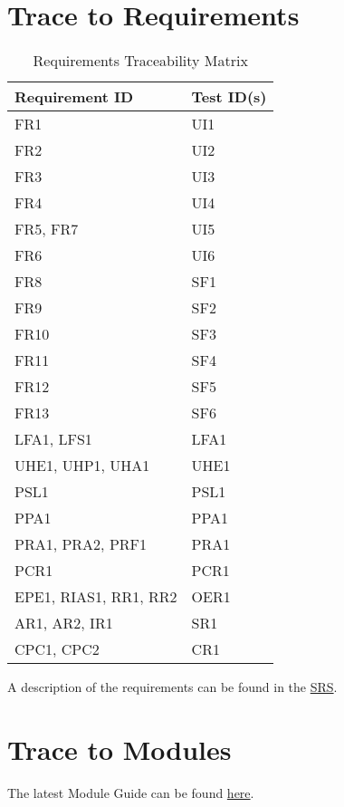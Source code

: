 \documentclass[12pt, titlepage]{article}
\begin{document}
\section{Trace to Requirements}

\begin{table}[H]
\caption{Requirements Traceability Matrix}
\begin{center}
\begin{tabular}{ |m{14em}|m{6em}|} 
 \hline
 Requirement ID & Test ID(s) \\ 
 \hline
 FR1 & UI1 \\
 \hline
 FR2 & UI2\\ 
 \hline
 FR3 & UI3\\
 \hline 
 FR4 & UI4\\
 \hline
 FR5, FR7 & UI5\\
 \hline
 FR6 & UI6\\
 \hline
 FR8 & SF1\\
 \hline
 FR9 &SF2\\
 \hline
 FR10 & SF3\\
 \hline
 FR11 &SF4\\
 \hline
 FR12 & SF5\\
 \hline
 FR13 & SF6\\
 \hline
 LFA1, LFS1 & LFA1\\
 \hline
 UHE1, UHP1, UHA1 & UHE1\\
 \hline 
 PSL1 & PSL1\\
 \hline
 PPA1 & PPA1\\
 \hline
 PRA1, PRA2, PRF1 & PRA1\\
 \hline
 PCR1 & PCR1\\
 \hline
 EPE1, RIAS1, RR1, RR2 & OER1\\
 \hline
 AR1, AR2, IR1 & SR1\\
 \hline
 CPC1, CPC2 & CR1\\
 \hline
\end{tabular}
\end{center}
\label{traceabilityFunc}
\end{table}
A description of the requirements can be found in the \href{https://gitlab.cas.mcmaster.ca/renx11/3xa3-project-l02-group9/-/blob/master/Doc/SRS/SRS-Rev1.pdf}{SRS}.

\section{Trace to Modules}

The latest Module Guide can be found \href{https://gitlab.cas.mcmaster.ca/renx11/3xa3-project-l02-group9/-/blob/master/Doc/DesignDoc/MG/MG-Rev0.pdf}{here}.
\end{document}
